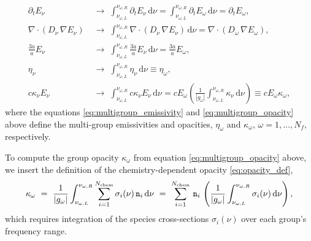 \documentclass[10pt]{article}
\renewcommand{\(}{\left(}
\renewcommand{\)}{\right)}
\newcommand{\adot}{\dot{a}}
\newcommand{\Enu}{E_{\nu}}
\newcommand{\mn}{{\tt n}}
\begin{document}
\begin{align}
 \label{eq:multigroup_timederivative}
   \partial_{t} \Enu &\;\rightarrow\;
   \int_{\nu_{\omega,L}}^{\nu_{\omega,R}} \partial_{t} \Enu\,\mathrm d\nu
   =
   \int_{\nu_{\omega,L}}^{\nu_{\omega,R}} \partial_{t} E_{\omega}\,\mathrm d\nu
   =
   \partial_{t} E_{\omega}, \\
 \label{eq:multigroup_diffusion}
   \nabla\cdot(D_{\nu}\,\nabla\Enu) &\;\rightarrow\;
   \int_{\nu_{\omega,L}}^{\nu_{\omega,R}} \nabla\cdot(D_{\nu}\,\nabla\Enu)\,\mathrm d\nu
   =
   \nabla\cdot(D_{\omega}\,\nabla E_{\omega}), \\
 \label{eq:multigroup_depletion}
   \frac{3 \adot}{a} \Enu &\;\rightarrow\;
   \int_{\nu_{\omega,L}}^{\nu_{\omega,R}} \frac{3 \adot}{a} \Enu\,\mathrm d\nu
   =
   \frac{3 \adot}{a} E_{\omega}, \\
 \label{eq:multigroup_emissivity}
   \eta_{\nu} &\;\rightarrow\;
   \int_{\nu_{\omega,L}}^{\nu_{\omega,R}} \eta_{\nu}\,\mathrm d\nu
   \equiv
   \eta_{\omega}, \\
 \label{eq:multigroup_opacity}
   c \kappa_{\nu} \Enu &\;\rightarrow\;
   \int_{\nu_{\omega,L}}^{\nu_{\omega,R}} c \kappa_{\nu} \Enu\,\mathrm d\nu
   =
   c E_{\omega}\left(\frac{1}{|g_{\omega}|} \int_{\nu_{\omega,L}}^{\nu_{\omega,R}} \kappa_{\nu}\,\mathrm d\nu\right)
   \equiv
   c E_{\omega} \kappa_{\omega},
\end{align}
where the equations \eqref{eq:multigroup_emissivity} and
\eqref{eq:multigroup_opacity} above define the multi-group emissivities
and opacities, $\eta_{\omega}$ and $\kappa_{\omega}$,
$\omega=1,\ldots,N_f$, respectively.

To compute the group opacity $\kappa_{\omega}$ from equation
\eqref{eq:multigroup_opacity} above, we insert the definition of the
chemistry-dependent opacity \eqref{eq:opacity_def},
\begin{align}
\label{eq:multigroup_opacity_calculation}
   \kappa_{\omega} \ = \ \frac{1}{|g_{\omega}|}
   \int_{\nu_{\omega,L}}^{\nu_{\omega,R}} \sum_{i=1}^{N_\text{chem}}
   \sigma_{i}(\nu)\,\mn_i\,\mathrm d\nu \ = \
   \sum_{i=1}^{N_\text{chem}}\,\mn_i\,
   \left(\frac{1}{|g_{\omega}|} \int_{\nu_{\omega,L}}^{\nu_{\omega,R}} 
   \sigma_{i}(\nu)\,\mathrm d\nu\right),
\end{align}
which requires integration of the species cross-sections
$\sigma_{i}(\nu)$ over each group's frequency range. 
\end{document}
